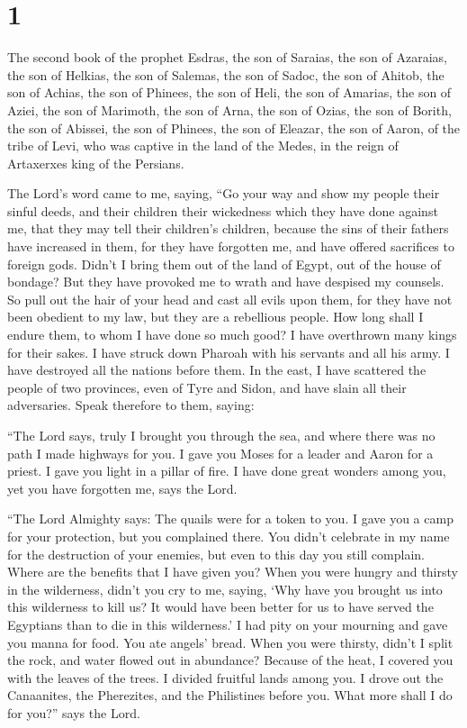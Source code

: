 \hypertarget{section}{%
\section{1}\label{section}}

 The second book of the prophet Esdras, the son of Saraias,
the son of Azaraias, the son of Helkias, the son of Salemas, the son of
Sadoc, the son of Ahitob,  the son of Achias, the son of
Phinees, the son of Heli, the son of Amarias, the son of Aziei, the son
of Marimoth, the son of Arna, the son of Ozias, the son of Borith, the
son of Abissei, the son of Phinees, the son of Eleazar,  the
son of Aaron, of the tribe of Levi, who was captive in the land of the
Medes, in the reign of Artaxerxes king of the Persians.

 The Lord's word came to me, saying,  ``Go your
way and show my people their sinful deeds, and their children their
wickedness which they have done against me, that they may tell their
children's children,  because the sins of their fathers have
increased in them, for they have forgotten me, and have offered
sacrifices to foreign gods.  Didn't I bring them out of the
land of Egypt, out of the house of bondage? But they have provoked me to
wrath and have despised my counsels.  So pull out the hair
of your head and cast all evils upon them, for they have not been
obedient to my law, but they are a rebellious people.  How
long shall I endure them, to whom I have done so much good?
 I have overthrown many kings for their sakes. I have
struck down Pharoah with his servants and all his army.  I
have destroyed all the nations before them. In the east, I have
scattered the people of two provinces, even of Tyre and Sidon, and have
slain all their adversaries.  Speak therefore to them,
saying:

 ``The Lord says, truly I brought you through the sea, and
where there was no path I made highways for you. I gave you Moses for a
leader and Aaron for a priest.  I gave you light in a
pillar of fire. I have done great wonders among you, yet you have
forgotten me, says the Lord.

 ``The Lord Almighty says: The quails were for a token to
you. I gave you a camp for your protection, but you complained there.
 You didn't celebrate in my name for the destruction of
your enemies, but even to this day you still complain. 
Where are the benefits that I have given you? When you were hungry and
thirsty in the wilderness, didn't you cry to me,  saying,
`Why have you brought us into this wilderness to kill us? It would have
been better for us to have served the Egyptians than to die in this
wilderness.'  I had pity on your mourning and gave you
manna for food. You ate angels' bread.  When you were
thirsty, didn't I split the rock, and water flowed out in abundance?
Because of the heat, I covered you with the leaves of the trees.
 I divided fruitful lands among you. I drove out the
Canaanites, the Pherezites, and the Philistines before you. What more
shall I do for you?'' says the Lord.

